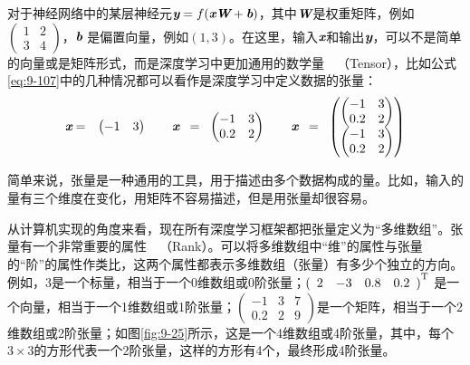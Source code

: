 \parinterval 对于神经网络中的某层神经元${\textbf{\em y}}=f({\textbf{\em x}}{\textbf{\em W}}+{\textbf{\em b}}) $，其中$ {\textbf{\em W}} $是权重矩阵，例如$ \begin{pmatrix} 1 & 2\\ 3 & 4\end{pmatrix} $，${\textbf{\em b}} $ 是偏置向量，例如$ (1,3) $。在这里，输入$ {\textbf{\em x}} $和输出$ {\textbf{\em y}} $，可以不是简单的向量或是矩阵形式，而是深度学习中更加通用的数学量\ \dash \ {\small{}}（Tensor），比如公式\eqref{eq:9-107}中的几种情况都可以看作是深度学习中定义数据的张量：
\begin{eqnarray}
{\textbf{\em x}}&=&\begin{pmatrix} -1 & 3\end{pmatrix}\qquad
{\textbf{\em x}}\;\;=\;\;\begin{pmatrix} -1 & 3\\ 0.2 & 2\end{pmatrix}\qquad
{\textbf{\em x}}\;\;=\;\;\begin{pmatrix}{\begin{pmatrix} -1 & 3\\ 0.2 & 2\end{pmatrix}}\\{\begin{pmatrix} -1 & 3\\ 0.2 & 2\end{pmatrix}}\end{pmatrix}
\label{eq:9-107}
\end{eqnarray}

\parinterval 简单来说，张量是一种通用的工具，用于描述由多个数据构成的量。比如，输入的量有三个维度在变化，用矩阵不容易描述，但是用张量却很容易。

\parinterval 从计算机实现的角度来看，现在所有深度学习框架都把张量定义为“多维数组”。张量有一个非常重要的属性\ \dash \ {\small{}}（Rank）。可以将多维数组中“维”的属性与张量的“阶”的属性作类比，这两个属性都表示多维数组（张量）有多少个独立的方向。例如，3是一个标量，相当于一个0维数组或0阶张量；$ {(\begin{array}{cccc} 2 & -3 & 0.8 & 0.2\end{array})}^{\textrm T} $ 是一个向量，相当于一个1维数组或1阶张量；$ \begin{pmatrix} -1 & 3 & 7\\ 0.2 & 2 & 9\end{pmatrix} $是一个矩阵，相当于一个2维数组或2阶张量；如图\ref{fig:9-25}所示，这是一个4维数组或4阶张量，其中，每个$3 \times 3$的方形代表一个2阶张量，这样的方形有4个，最终形成4阶张量。

